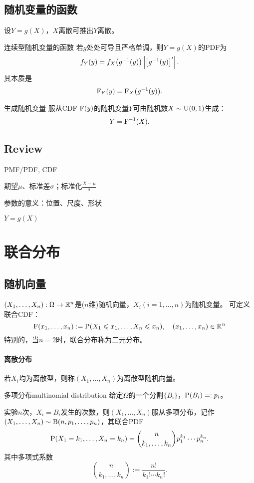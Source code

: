 \subsection{随机变量的函数}
设$Y=g(X)$，$X$离散可推出$Y$离散。
\begin{theorem}{连续型随机变量的函数}{}
	若$g$处处可导且严格单调，则$Y=g(X)$的PDF为
	\begin{align}
		f_Y(y)=f_X\bigkh{g^{-1}(y)}\abs{\fkh{g^{-1}(y)}'}.
	\end{align}
	其本质是
	\begin{align}
		\CDF_Y(y)=\CDF_X\bigkh{g^{-1}(y)}.
	\end{align}
\end{theorem}
\begin{example}{生成随机变量}{}
	服从CDF $\CDF(y)$的随机变量$Y$可由随机数$X\sim\Unif(0,1)$生成：
	\begin{align}
		Y=\CDF\inv(X).
	\end{align}
\end{example}
\subsection*{Review}
\begin{compactenum}
	\item PMF/PDF, CDF
	\item 期望$\mu$、标准差$\sigma$；标准化$\frac{X-\mu}\sigma$
	\item 参数的意义：位置、尺度、形状
	\item $Y=g(X)$
\end{compactenum}
\clearpage
\section{联合分布}
\subsection{随机向量}
$(X_1,\ldots,X_n):\Omega\to\RR^n$是($n$维)随机向量，$X_i(i=1,\ldots,n)$为随机变量。
可定义联合CDF：
\[
	\CDF(x_1,\ldots,x_n):=\P(X_1\leqslant x_1,\ldots,X_n\leqslant x_n),\quad(x_1,\ldots,x_n)\in\RR^n
\]
特别的，当$n=2$时，联合分布称为二元分布。
\paragraph{离散分布}若$X_i$均为离散型，则称$(X_1,\ldots,X_n)$为离散型随机向量。

\begin{example}{多项分布}{multinomial distribution}
	给定$\Omega$的一个分割$\{B_i\}$，$\P(B_i)=:p_i$。
	
	实验$n$次，$X_i=B_i$发生的次数，则$(X_1,\ldots,X_n)$服从多项分布，记作$(X_1,\ldots,X_n)\sim\Bern(n,p_1,\ldots,p_n)$，其联合PDF
	\[
		\P(X_1=k_1,\ldots,X_n=k_n)={n\choose k_1,\ldots,k_n}p_1^{k_1}\cdots p_n^{k_n}.
	\]
	其中多项式系数
	\[
		{n\choose k_1,\ldots,k_n}:=\frac{n!}{k_1!\cdots k_n!}.
	\]
\end{example} 	
